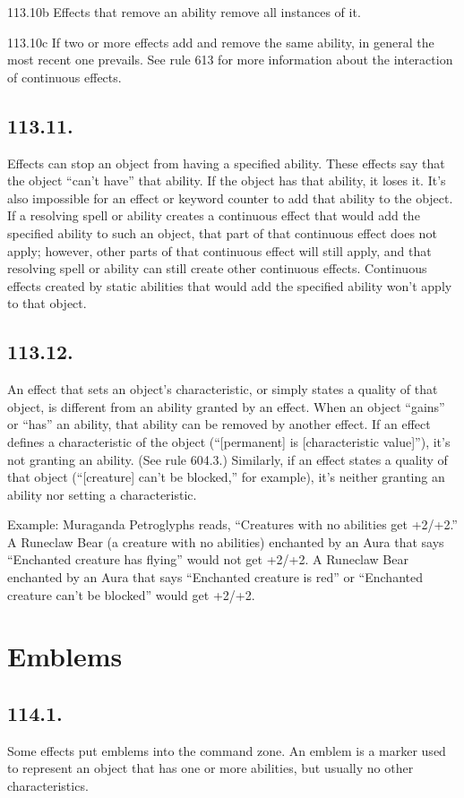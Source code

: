 113.10b Effects that remove an ability remove all instances of it.

113.10c If two or more effects add and remove the same ability, in general the most recent one prevails. See rule 613 for more information about the interaction of continuous effects.

\subsection*{113.11.}
Effects can stop an object from having a specified ability. These effects say that the object “can’t have” that ability. If the object has that ability, it loses it. It’s also impossible for an effect or keyword counter to add that ability to the object. If a resolving spell or ability creates a continuous effect that would add the specified ability to such an object, that part of that continuous effect does not apply; however, other parts of that continuous effect will still apply, and that resolving spell or ability can still create other continuous effects. Continuous effects created by static abilities that would add the specified ability won’t apply to that object.

\subsection*{113.12.}
An effect that sets an object’s characteristic, or simply states a quality of that object, is different from an ability granted by an effect. When an object “gains” or “has” an ability, that ability can be removed by another effect. If an effect defines a characteristic of the object (“[permanent] is [characteristic value]”), it’s not granting an ability. (See rule 604.3.) Similarly, if an effect states a quality of that object (“[creature] can’t be blocked,” for example), it’s neither granting an ability nor setting a characteristic.

Example: Muraganda Petroglyphs reads, “Creatures with no abilities get +2/+2.” A Runeclaw Bear (a creature with no abilities) enchanted by an Aura that says “Enchanted creature has flying” would not get +2/+2. A Runeclaw Bear enchanted by an Aura that says “Enchanted creature is red” or “Enchanted creature can’t be blocked” would get +2/+2.

\section{Emblems}
\subsection*{114.1.}
Some effects put emblems into the command zone. An emblem is a marker used to represent an object that has one or more abilities, but usually no other characteristics.

